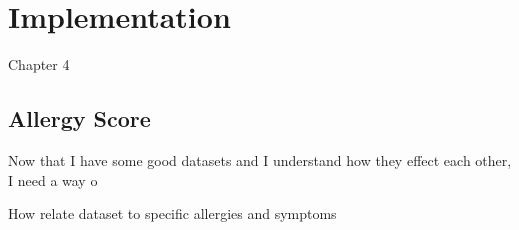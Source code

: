 \chapter{Implementation}
\label{cha:impl}

Chapter 4

\section{Allergy Score}

Now that I have some good datasets and I understand how they effect each other, I need a way o

How relate dataset to specific allergies and symptoms